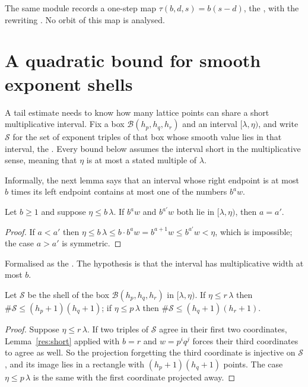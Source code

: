 \documentclass[11pt]{article}
\newcommand{\lo}{\lambda}
\newcommand{\hi}{\eta}
\begin{document}
The same module records a one-step map $\tau(b,d,s)=b(s-d)$, the
, with the rewriting
.  No orbit of this map is analysed.

\section{A quadratic bound for smooth exponent shells}\label{sec:shell}

A tail estimate needs to know how many lattice points can share a short
multiplicative interval.  Fix a box $\mathcal B(h_p,h_q,h_r)$ and an interval
$[\lo,\hi)$, and write $\mathcal S$ for the set of exponent triples of that box
whose smooth value lies in that interval, the
.  Every bound below assumes the interval short in the
multiplicative sense, meaning that $\hi$ is at most a stated multiple of $\lo$.

Informally, the next lemma says that an interval whose right endpoint is at
most $b$ times its left endpoint contains at most one of the numbers $b^{a}w$.

\begin{lemma}\label{res:short}
Let $b\ge1$ and suppose $\hi\le b\,\lo$.  If $b^{a}w$ and $b^{a'}w$ both lie in
$[\lo,\hi)$, then $a=a'$.
\end{lemma}

\begin{proof}
If $a<a'$ then $\hi\le b\,\lo\le b\cdot b^{a}w=b^{a+1}w\le b^{a'}w<\hi$, which
is impossible; the case $a>a'$ is symmetric.
\end{proof}

\noindent Formalised as the
.  The hypothesis is that the interval has multiplicative width at
most $b$.

\begin{proposition}\label{res:drop}
Let $\mathcal S$ be the shell of the box $\mathcal B(h_p,h_q,h_r)$ in
$[\lo,\hi)$.  If $\hi\le r\,\lo$ then $\#\mathcal S\le(h_p+1)(h_q+1)$; if
$\hi\le p\,\lo$ then $\#\mathcal S\le(h_q+1)(h_r+1)$.
\end{proposition}

\begin{proof}
Suppose $\hi\le r\,\lo$.  If two triples of $\mathcal S$ agree in their first
two coordinates, Lemma~\ref{res:short} applied with $b=r$ and $w=p^{i}q^{j}$
forces their third coordinates to agree as well.  So the projection forgetting
the third coordinate is injective on $\mathcal S$, and its image lies in a
rectangle with $(h_p+1)(h_q+1)$ points.  The case $\hi\le p\,\lo$ is the same
with the first coordinate projected away.
\end{proof}
\end{document}
